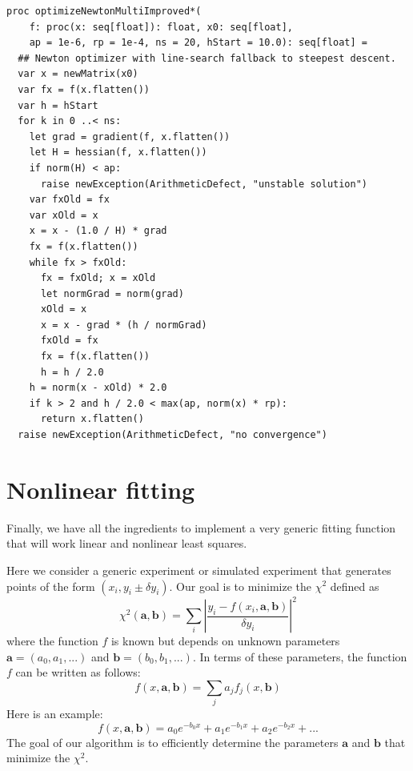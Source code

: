 \documentclass[justified, sixbynine]{tufte-book}
\def\ft{\small\tt}
\theoremstyle{plain}%
\newtheorem * {corollary}{Corollary}
\theoremstyle{definition}
\theoremstyle{remark}
\newtheorem * {remark}{Remark}
\newtheorem * {note}{Note}
\begin{document}
\begin{fullwidth}
\begin{lstlisting}[caption={in file: {\ft nlib.nim}}]
proc optimizeNewtonMultiImproved*(
    f: proc(x: seq[float]): float, x0: seq[float],
    ap = 1e-6, rp = 1e-4, ns = 20, hStart = 10.0): seq[float] =
  ## Newton optimizer with line-search fallback to steepest descent.
  var x = newMatrix(x0)
  var fx = f(x.flatten())
  var h = hStart
  for k in 0 ..< ns:
    let grad = gradient(f, x.flatten())
    let H = hessian(f, x.flatten())
    if norm(H) < ap:
      raise newException(ArithmeticDefect, "unstable solution")
    var fxOld = fx
    var xOld = x
    x = x - (1.0 / H) * grad
    fx = f(x.flatten())
    while fx > fxOld:
      fx = fxOld; x = xOld
      let normGrad = norm(grad)
      xOld = x
      x = x - grad * (h / normGrad)
      fxOld = fx
      fx = f(x.flatten())
      h = h / 2.0
    h = norm(x - xOld) * 2.0
    if k > 2 and h / 2.0 < max(ap, norm(x) * rp):
      return x.flatten()
  raise newException(ArithmeticDefect, "no convergence")
\end{lstlisting}

\goodbreak\section{Nonlinear fitting}

Finally, we have all the ingredients to implement a very generic fitting function that will work linear and nonlinear least squares.

Here we consider a generic experiment or simulated experiment that generates points of the form $(x_i, y_i \pm \delta y_i)$. Our goal is to minimize the $\chi^2$ defined as
\begin{equation}
\chi^2(\mathbf{a}, \mathbf{b}) = \sum _i \left|
\frac{y_i - f(x_i, \mathbf{a}, \mathbf{b})}{\delta y_i}
\right|^2
\end{equation}
where the function $f$ is known but depends on unknown parameters $\mathbf{a}=(a_0, a_1, ...)$ and $\mathbf{b}=(b_0, b_1, ...)$. In terms of these parameters, the function $f$ can be written as follows:
\begin{equation}
f(x, \mathbf{a}, \mathbf{b}) = \sum_j a_j f_j(x, \mathbf{b})
\end{equation}
Here is an example:
\begin{equation}
f(x, \mathbf{a}, \mathbf{b}) = a_0 e^{-b_0 x} + a_1 e^{-b_1 x} + a_2 e^{-b_2 x} + ...
\end{equation}
The goal of our algorithm is to efficiently determine the parameters $\mathbf{a}$ and $\mathbf{b}$ that minimize the $\chi^2$.


\end{fullwidth}
\end{document}
